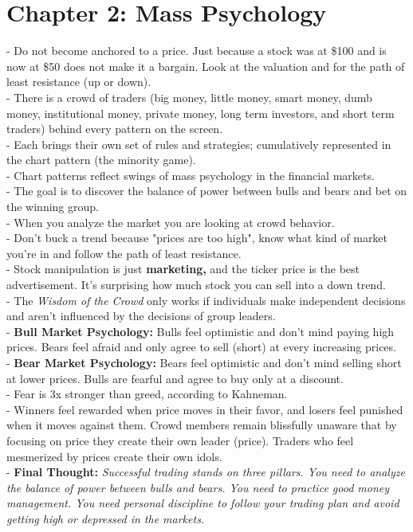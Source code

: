 \documentclass[12pt,fullpage]{article}
\begin{document}
\section*{Chapter 2: Mass Psychology}
- Do not become anchored to a price. Just because a stock was at \$100 and is now at \$50 does not make it a bargain. Look at the valuation and for the path of least resistance (up or down).\\
- There is a crowd of traders (big money, little money, smart money, dumb money, institutional money, private money, long term investors, and short term traders) behind every pattern on the screen.\\
- Each brings their own set of rules and strategies; cumulatively represented in the chart pattern (the minority game).\\
- Chart patterns reflect swings of mass psychology in the financial markets.\\
- The goal is to discover the balance of power between bulls and bears and bet on the winning group.\\
- When you analyze the market you are looking at crowd behavior.\\
- Don't buck a trend because "prices are too high", know what kind of market you're in and follow the path of least resistance.\\
- Stock manipulation is just \textbf{marketing,} and the ticker price is the best advertisement. It's surprising how much stock you can sell into a down trend.\\
- The \emph{Wisdom of the Crowd} only works if individuals make independent decisions and aren't influenced by the decisions of group leaders.\\
- \textbf{Bull Market Psychology:} Bulls feel optimistic and don't mind paying high prices. Bears feel afraid and only agree to sell (short) at every increasing prices.\\
- \textbf{Bear Market Psychology:} Bears feel optimistic and don't mind selling short at lower prices. Bulls are fearful and agree to buy only at a discount.\\
- Fear is 3x stronger than greed, according to Kahneman.\\
- Winners feel rewarded when price moves in their favor, and losers feel punished when it moves against them. Crowd members remain blissfully unaware that by focusing on price they create their own leader (price). Traders who feel mesmerized by prices create their own idols.\\
- \textbf{Final Thought:} \emph{Successful trading stands on three pillars. You need to analyze the balance of power between bulls and bears. You need to practice good money management. You need personal discipline to follow your trading plan and avoid getting high or depressed in the markets.}\\
\end{document}
